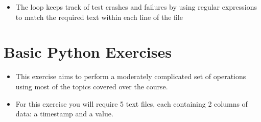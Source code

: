 \documentclass[letterpaper,10pt,english,openany]{sphinxmanual}
\begin{document}
\begin{sphinxVerbatim}[commandchars=\\\{\}]

\end{sphinxVerbatim}
\begin{itemize}
\item {} 
The loop keeps track of test crashes and failures by using regular
expressions to match the required text within each line of the file

\end{itemize}



\section{Basic Python Exercises}
\label{\detokenize{introduction_to_python/basic_python_exercises_5:basic-python-exercises}}\label{\detokenize{introduction_to_python/basic_python_exercises_5:basic-python-exercises-5}}\label{\detokenize{introduction_to_python/basic_python_exercises_5::doc}}\begin{itemize}
\item {} 
This exercise aims to perform a moderately complicated set of
operations using most of the topics covered over the course.

\item {} 
For this exercise you will require 5 text files, each containing 2
columns of data: a timestamp and a value.

\end{itemize}
\end{document}

